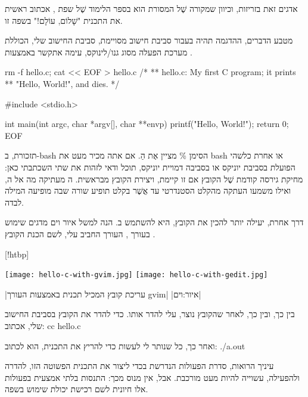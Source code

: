 אדגים זאת בזריזות, וכיוון שמקורה שֶׁל המסורת הוא בספר הלימוד
שֶׁל שפת , אכתוב
ראשית את התכנית "שָׁלוֹם, עוֹלָם!" בשפה זו.

מטבע הדברים, ההדגמה תהיה בעבור סביבת חישוב מסויימת, סביבת החישוב שלי, הכוללת
מערכת הפעלה מסוג גנו/לינוקס, עימה אתקשר באמצעות  .

\bash[verbose,script,scriptFile=make-hello-c.sh]
rm -f hello.c; cat << EOF > hello.c
/*
** hello.c: My first C program; it prints
** "Hello, World!", and dies.
*/

#include <stdio.h>

int main(int argc, char *argv[], char **envp) {
  printf("Hello, World!\n");
  return 0;
}
EOF
\END
{}

{
  \noindent\hrulefill

  תזכורת, ב-bash הסימן \% מציין אֶת הַ. אם אתה מכיר מעט את bash או
  אחרת כלשהי הפועלת בסביבת יוניקס או בסביבה דמויית יוניקס, תוכל ודאי
  לזהות את שתי ה שכתבתי כאן: מחיקת גירסה קודמת שֶׁל הקובץ אם זו קיימת,
  ויצירת הקובץ מבראשית. ה  מעתיקה מה אל ה, ואילו 
  משמעו העתקה מהקלט הסטנדרטי עד אֲשֶׁר בקלט תופיע שורה שבה מופיעה המילה
   לבדה.

  \par\noindent\hrulefill}

דרך אחרת, יעילה יותר להכין את הקובץ, היא להשתמש ב. הנה למשל  איור וים
מדגים שימוש בעורך , העורך החביב עלי, לשם הכנת הקובץ .

[!htbp]
\begin{center}
\texttt{[image: hello-c-with-gvim.jpg]}
\texttt{[image: hello-c-with-gedit.jpg]}
\end{center}
|עריכת קובץ המכיל תכנית  באמצעות העורך gvim|
|איור:וים|

בין כך, ובין כך, לאחר שהקובץ נוצר, עלי להדר אותו. כדי להדר את הקובץ בסביבת
החישוב שלי, אכתוב:
\bash[script]
cc hello.c
\END

ואחר כך, כל שנותר לי לעשות כדי להריץ את התכנית, הוא לכתוב:
./a.out
\END

עיניך הרואות, סדרת הפעולות הנדרשת בכדי ליצור את התכנית הפשוטה הזו, להדרה
ולהפעילה, עשוייה להיות מעט מורכבת. אבל, אין מנוס מכך: התנסות בלתי אמצעית
בפעולות אלו חיונית לשם רכישת יכולת שימוש בשפה.

